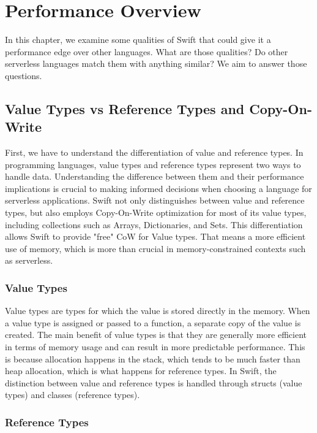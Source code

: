 \chapter{Performance Overview}
\etocsettocstyle{\rule{\textwidth}{1pt}}{\rule{\textwidth}{1pt}} %
\localtableofcontents
In this chapter, we examine some qualities of Swift that could give it a performance edge over other languages. What are those qualities? Do other serverless languages match them with anything similar? We aim to answer those questions.
\section{Value Types vs Reference Types and Copy-On-Write}
First, we have to understand the differentiation of value and reference types.
In programming languages, value types and reference types represent two ways to handle data. Understanding the difference between them and their performance implications is crucial to making informed decisions when choosing a language for serverless applications. Swift not only distinguishes between value and reference types, but also employs Copy-On-Write optimization for most of its value types, including collections such as Arrays, Dictionaries, and Sets.
This differentiation allows Swift to provide "free" CoW for Value types. That means a more efficient use of memory, which is more than crucial in memory-constrained contexts such as serverless.

\subsection{Value Types}

Value types are types for which the value is stored directly in the memory. When a value type is assigned or passed to a function, a separate copy of the value is created. The main benefit of value types is that they are generally more efficient in terms of memory usage and can result in more predictable performance. This is because allocation happens in the stack, which tends to be much faster than heap allocation, which is what happens for reference types. In Swift, the distinction between value and reference types is handled through structs (value types) and classes (reference types).

\subsection{Reference Types}

